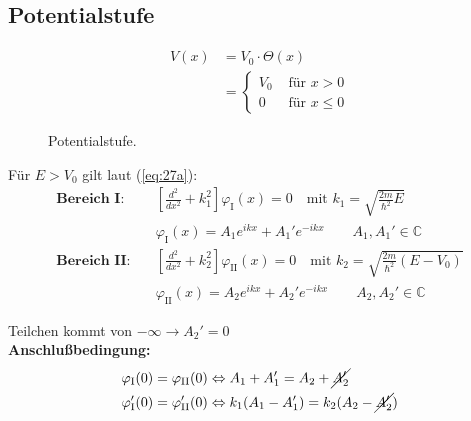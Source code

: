 \subsection{Potentialstufe}

\begin{figure}[htbp]
  \begin{minipage}[h]{0.4\linewidth}
    \begin{align*}
      V(x)&=V_0\cdot\Theta(x) \\
      &= \begin{cases}
        V_0 & \mbox{ für }x>0\\
        0 & \mbox{ für }x\leq0
      \end{cases}
    \end{align*}
    \vspace{1cm}
  \end{minipage}
  \hfill
  \begin{minipage}[h]{0.5\linewidth}
    
  \end{minipage}
  \caption{Potentialstufe.}
  \label{figu:5}
\end{figure}

Für $E>V_0$ gilt laut (\ref{eq:27a}):
\begin{align*}
    \textbf{Bereich I:} \quad &\left[\frac{d^2}{dx^2}+k_1^2\right]\varphi_{\text{I}}(x)=0 
    \quad \textrm{mit } k_1=\sqrt{\frac{2m}{\hbar^2}E} \\
    &\varphi_\textrm{I}(x)=A_1e^{ikx}+A_1'e^{-ikx} \qquad A_1,A_1' \in \mathbb{C} \\[2ex]
    \textbf{Bereich II:} \quad &\left[\frac{d^2}{dx^2}+k_2^2\right]\varphi_{\text{II}}(x)=0
    \quad  \textrm{mit } k_2=\sqrt{\frac{2m}{\hbar^2}(E-V_0)} \\
     &\varphi_\textrm{II}(x)=A_2e^{ikx}+A_2'e^{-ikx} \qquad A_2,A_2' \in \mathbb{C}
\end{align*}

Teilchen kommt von $-\infty \rightarrow A_2' = 0$\\
\textbf{Anschlußbedingung:}
\begin{align}
  \varphi_\textrm{I}(0) 
  = \varphi_\textrm{II}(0) & \Leftrightarrow  A_1 + A_1' 
  = A_2 + \cancel{A_2'}\label{eq1:Stufe-eq1}\\
 \varphi'_\textrm{I}(0) 
 = \varphi'_\textrm{II}(0) & \Leftrightarrow  k_1(A_1 - A_1') 
 = k_2(A_2 - \cancel{A_2'}) \label{eq2:Stufe-eq2}
\end{align}

